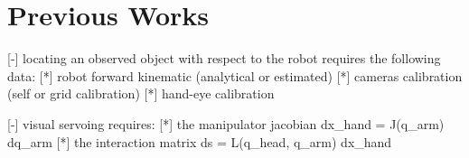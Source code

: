 \section{Previous Works}

[-] locating an observed object with respect to the robot requires the following data:
		[*] robot forward kinematic (analytical or estimated)
		[*] cameras calibration (self or grid calibration)
		[*] hand-eye calibration 
		
[-] visual servoing requires:
		[*] the manipulator jacobian dx_hand = J(q_arm) dq_arm
		[*] the interaction matrix ds = L(q_head, q_arm) dx_hand